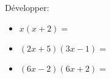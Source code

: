 \documentclass{automatisme}
\begin{document}
\begin{frame}
	Développer:

	\begin{itemize}
		\item $x(x + 2) = $
		\item $(2x + 5)(3x - 1) = $
		\item $(6x - 2)(6x + 2) = $
	\end{itemize}
\end{frame}
\end{document}
